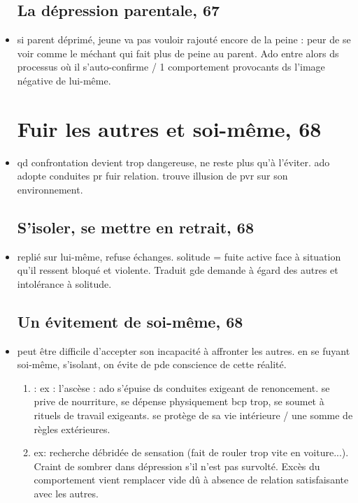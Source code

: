 \documentclass[12pt]{report}
\begin{document}
\begin{itemize}
\subsection{La dépression parentale, 67}

\item si parent déprimé, jeune va pas vouloir rajouté encore de la peine : peur de se voir comme le méchant qui fait plus de peine au parent. Ado entre alors ds processus où il s'auto-confirme / 1 comportement provocants ds l'image négative de lui-même.

\section{Fuir les autres et soi-même, 68}
\item qd confrontation devient trop dangereuse, ne reste plus qu'à l'éviter.  ado adopte conduites pr fuir relation. trouve illusion de pvr sur son environnement.

\subsection{S'isoler, se mettre en retrait, 68}

\item replié sur lui-même, refuse échanges. solitude = fuite active face à situation qu'il ressent bloqué et violente. Traduit gde demande à égard des autres et intolérance à solitude.

\subsection{Un évitement de soi-même, 68}

\item peut être difficile d'accepter son incapacité à affronter les autres. en se fuyant soi-même, s'isolant, on évite de pde conscience de cette réalité.
\begin{enumerate}
\item : ex : l'ascèse : ado s'épuise ds conduites exigeant de renoncement. se prive de nourriture, se dépense physiquement bcp trop, se soumet à rituels de travail exigeants. se protège de sa vie intérieure / une somme de règles extérieures.\\
\item ex: recherche débridée de sensation (fait de rouler trop vite en voiture...). Craint de sombrer dans dépression s'il n'est pas survolté. Excès du comportement vient remplacer vide dû à absence de relation satisfaisante avec les autres.\\
\end{enumerate}


\end{itemize}
\end{document}
